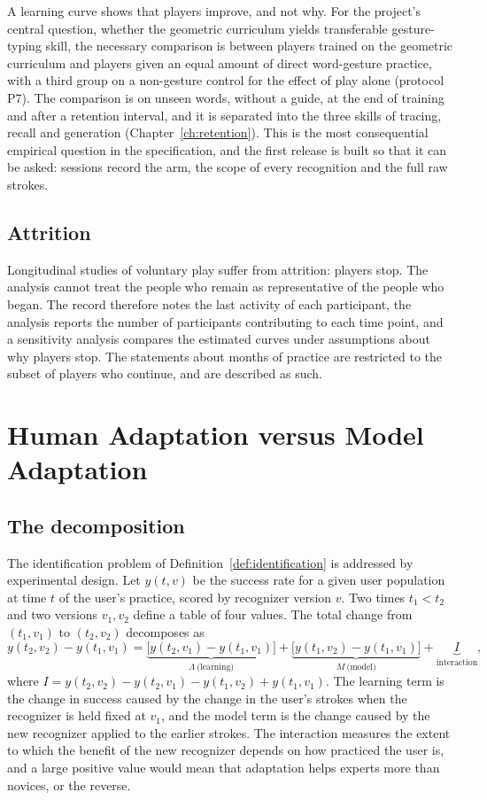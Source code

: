 A learning curve shows that players improve, and not why. For the project's central question, whether the geometric curriculum yields transferable gesture-typing skill, the necessary comparison is between players trained on the geometric curriculum and players given an equal amount of direct word-gesture practice, with a third group on a non-gesture control for the effect of play alone (protocol P7). The comparison is on unseen words, without a guide, at the end of training and after a retention interval, and it is separated into the three skills of tracing, recall and generation (Chapter~\ref{ch:retention}). This is the most consequential empirical question in the specification, and the first release is built so that it can be asked: sessions record the arm, the scope of every recognition and the full raw strokes.\evH

\section{Attrition}

Longitudinal studies of voluntary play suffer from attrition: players stop. The analysis cannot treat the people who remain as representative of the people who began. The record therefore notes the last activity of each participant, the analysis reports the number of participants contributing to each time point, and a sensitivity analysis compares the estimated curves under assumptions about why players stop. The statements about months of practice are restricted to the subset of players who continue, and are described as such.

\chapter{Human Adaptation versus Model Adaptation}\label{ch:human-vs-model}

\section{The decomposition}

The identification problem of Definition~\ref{def:identification} is addressed by experimental design. Let $y(t,v)$ be the success rate for a given user population at time $t$ of the user's practice, scored by recognizer version $v$. Two times $t_1<t_2$ and two versions $v_1,v_2$ define a table of four values. The total change from $(t_1,v_1)$ to $(t_2,v_2)$ decomposes as
\[
y(t_2,v_2)-y(t_1,v_1)=\underbrace{\bigl[y(t_2,v_1)-y(t_1,v_1)\bigr]}_{\Lambda\ \text{(learning)}}+\underbrace{\bigl[y(t_1,v_2)-y(t_1,v_1)\bigr]}_{M\ \text{(model)}}+\underbrace{I}_{\text{interaction}},
\]
where $I=y(t_2,v_2)-y(t_2,v_1)-y(t_1,v_2)+y(t_1,v_1)$. The learning term is the change in success caused by the change in the user's strokes when the recognizer is held fixed at $v_1$, and the model term is the change caused by the new recognizer applied to the earlier strokes. The interaction measures the extent to which the benefit of the new recognizer depends on how practiced the user is, and a large positive value would mean that adaptation helps experts more than novices, or the reverse.

